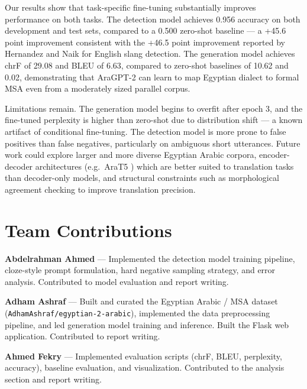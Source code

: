 \documentclass[11pt]{article}
\begin{document}
Our results show that task-specific fine-tuning substantially improves performance on both tasks. The detection model achieves 0.956 accuracy on both development and test sets, compared to a 0.500 zero-shot baseline — a +45.6 point improvement consistent with the +46.5 point improvement reported by Hernandez and Naik for English slang detection. The generation model achieves chrF of 29.08 and BLEU of 6.63, compared to zero-shot baselines of 10.62 and 0.02, demonstrating that AraGPT-2 can learn to map Egyptian dialect to formal MSA even from a moderately sized parallel corpus.

Limitations remain. The generation model begins to overfit after epoch 3, and the fine-tuned perplexity is higher than zero-shot due to distribution shift — a known artifact of conditional fine-tuning. The detection model is more prone to false positives than false negatives, particularly on ambiguous short utterances. Future work could explore larger and more diverse Egyptian Arabic corpora, encoder-decoder architectures (e.g.\ AraT5 \cite{nagoudi2022}) which are better suited to translation tasks than decoder-only models, and structural constraints such as morphological agreement checking to improve translation precision.

\section*{Team Contributions}

\textbf{Abdelrahman Ahmed} — Implemented the detection model training pipeline, cloze-style prompt formulation, hard negative sampling strategy, and error analysis. Contributed to model evaluation and report writing.

\textbf{Adham Ashraf} — Built and curated the Egyptian Arabic / MSA dataset (\texttt{AdhamAshraf/egyptian-2-arabic}), implemented the data preprocessing pipeline, and led generation model training and inference. Built the Flask web application. Contributed to report writing.

\textbf{Ahmed Fekry} — Implemented evaluation scripts (chrF, BLEU, perplexity, accuracy), baseline evaluation, and visualization. Contributed to the analysis section and report writing.

{\small


}
\end{document}
